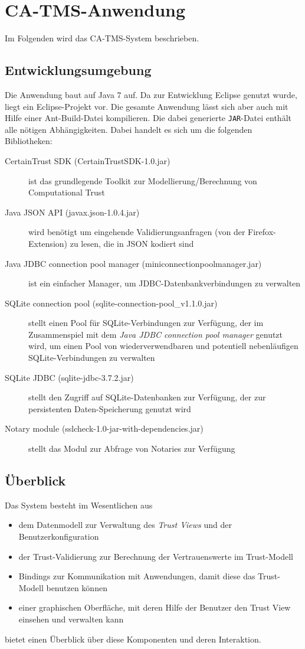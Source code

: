 \documentclass[accentcolor=tud1c,article,colorback,11pt]{tudreport}
\begin{document}
\section{CA-TMS-Anwendung}

Im Folgenden wird das CA-TMS-System beschrieben.

\subsection{Entwicklungsumgebung}
Die Anwendung baut auf Java 7 auf. Da zur Entwicklung Eclipse genutzt wurde, liegt ein Eclipse-Projekt vor. Die gesamte Anwendung lässt sich aber auch mit Hilfe einer Ant-Build-Datei kompilieren. Die dabei generierte \texttt{JAR}-Datei enthält alle nötigen Abhängigkeiten. Dabei handelt es sich um die folgenden Bibliotheken:
\begin{description}
\item[CertainTrust SDK (CertainTrustSDK-1.0.jar)] ist das grundlegende Toolkit zur Modellierung/Berechnung von Computational Trust
\item[Java JSON API (javax.json-1.0.4.jar)] wird benötigt um eingehende Validierungsanfragen (von der Firefox-Extension) zu lesen, die in JSON kodiert sind
\item[Java JDBC connection pool manager (miniconnectionpoolmanager.jar)] ist ein einfacher Manager, um JDBC-Datenbankverbindungen zu verwalten
\item[SQLite connection pool (sqlite-connection-pool\_v1.1.0.jar)] stellt einen Pool für SQLite-Verbindungen zur Verfügung, der im Zusammenspiel mit dem \textit{Java JDBC connection pool manager} genutzt wird, um einen Pool von wiederverwendbaren und potentiell nebenläufigen SQLite-Verbindungen zu verwalten
\item[SQLite JDBC (sqlite-jdbc-3.7.2.jar)] stellt den Zugriff auf SQLite-Datenbanken zur Verfügung, der zur persistenten Daten-Speicherung genutzt wird
\item[Notary module (sslcheck-1.0-jar-with-dependencies.jar)] stellt das Modul zur Abfrage von Notaries zur Verfügung
\end{description}

\subsection{Überblick}
Das System besteht im Wesentlichen aus
\begin{itemize}
\item dem Datenmodell zur Verwaltung des \textit{Trust Views} und der Benutzerkonfiguration
\item der Trust-Validierung zur Berechnung der Vertrauenswerte im Trust-Modell
\item Bindings zur Kommunikation mit Anwendungen, damit diese das Trust-Modell benutzen können
\item einer graphischen Oberfläche, mit deren Hilfe der Benutzer den Trust View  einsehen und verwalten kann
\end{itemize}
 bietet einen Überblick über diese Komponenten und deren Interaktion.
\end{document}

